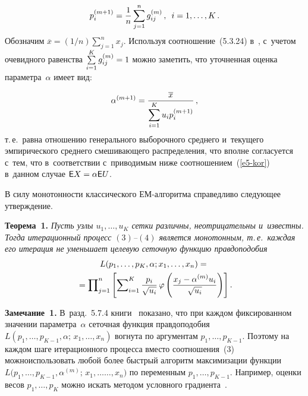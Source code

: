 \begin{multicols}{2}
\noindent
\begin{equation}
p_i^{(m+1)}=\displaystyle\frac{\displaystyle 1\mathstrut}{\displaystyle n\mathstrut}\sum\limits_{j=1}^n g_{ij}^{(m)}\,, \enskip
i=1,\ldots,K\,.\label{e3-kor}
\end{equation}
Обозначим $\overline{x}=(1/n)\sum\limits_{j=1}^nx_j$. Используя
соотношение~(5.3.24) в~\cite{k2011}, с~учетом очевидного равенства
$\sum\limits_{i=1}^K g_{ij}^{(m)}\hm=1$ можно заметить, что уточненная
оценка параметра~$\alpha$ имеет вид:

\columnbreak

\noindent
\begin{equation}
\alpha^{(m+1)}=\displaystyle\frac{\displaystyle \overline{x}\mathstrut}{\displaystyle \sum\limits_{i=1}^K u_ip_i^{(m+1)}\mathstrut}\,,
\label{e4-kor}
\end{equation}
т.\,е.\ равна отношению генерального выборочного среднего и~текущего
эмпирического среднего смешивающего распределения, что вполне
согласуется с~тем, что в~соответствии с~приводимым ниже соотношением~(\ref{e5-kor})
в~данном случае ${\sf E}X\hm=\alpha{\sf E}U$.

В силу монотонности классического ЕМ-ал\-го\-рит\-ма справедливо следующее
утверждение.

\smallskip

\noindent
\textbf{Теорема~1.} {\it Пусть узлы $u_1,\ldots,u_K$ сетки различны,
неотрицательны и~известны. Тогда итерационный процесс $(3)$--$(4)$
является монотонным, т.\,е.\ каждая его итерация не уменьшает
целевую сеточную функцию правдоподобия}
\begin{multline*}
L(p_1,\ldots,p_K,\alpha;x_1,\ldots,x_n)={}\\
{}=
\prod\nolimits_{j=1}^n\left[\sum\nolimits_{i=1}^K
\displaystyle\frac{\displaystyle p_i\mathstrut}{\displaystyle \sqrt{u_i}\mathstrut}\,\varphi\left(\displaystyle\frac{\displaystyle x_j-\alpha^{(m)}u_i\mathstrut}{\displaystyle \sqrt{u_i}\mathstrut}\right)\right].
\end{multline*}

\smallskip

\noindent
\textbf{Замечание~1.} В~разд.~5.7.4 книги~\cite{k2011} показано, что
при каждом фиксированном значении параметра~$\alpha$ сеточная
функция правдоподобия\linebreak
$L(p_1,\ldots,p_{K-1},\alpha;\,x_1,\ldots,x_n)$ вогнута по
аргументам $p_1,\ldots,p_{K-1}$. Поэтому на каждом шаге
итерационного процесса вместо соотношения~(3) можно\linebreak использо\-вать
любой более быстрый алгоритм максимизации функции
$L(p_1,\ldots,p_{K-1},\alpha^{(m)};\,x_1,\ldots$\linebreak $\ldots,x_n)$ по переменным
$p_1,\ldots,p_{K-1}$. Например, оценки весов $p_1,\ldots,p_K$ можно
искать методом условного градиента~\cite{k2011, kn2010}.


\end{multicols}
